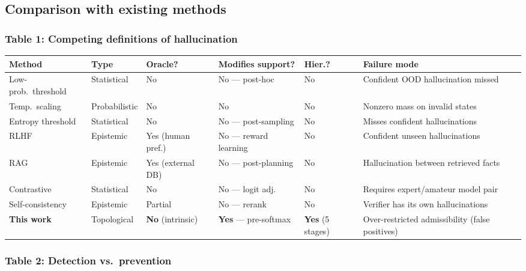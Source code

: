 \documentclass[11pt,a4paper]{article}
\begin{document}
\subsection{Comparison with existing methods}

\subsubsection*{Table 1: Competing definitions of hallucination}

\begin{center}
\renewcommand{\arraystretch}{1.2}\footnotesize
\begin{tabularx}{\linewidth}{p{1.6cm}p{1.65cm}p{1.3cm}p{1.5cm}p{1.4cm}X}
\toprule
\textbf{Method} &
\textbf{Type} &
\textbf{Oracle?} &
\textbf{Modifies support?} &
\textbf{Hier.?} &
\textbf{Failure mode} \\
\midrule
Low-prob.\ threshold & Statistical & No & No — post-hoc & No &
  Confident OOD hallucination missed \\
Temp.\ scaling & Probabilistic & No & No & No &
  Nonzero mass on invalid states \\
Entropy threshold & Statistical & No & No — post-sampling & No &
  Misses confident hallucinations \\
RLHF & Epistemic & Yes (human pref.) & No — reward learning & No &
  Confident unseen hallucinations \\
RAG & Epistemic & Yes (external DB) & No — post-planning & No &
  Hallucination between retrieved facts \\
Contrastive & Statistical & No & No --- logit adj. & No &
  Requires expert/amateur model pair \\
Self-consistency & Epistemic & Partial & No --- rerank & No &
  Verifier has its own hallucinations \\
\midrule
\textbf{This work} & Topological & \textbf{No} (intrinsic) &
  \textbf{Yes} --- pre-softmax &
  \textbf{Yes} (5 stages) &
  Over-restricted admissibility (false positives) \\
\bottomrule
\end{tabularx}
\end{center}

\subsubsection*{Table 2: Detection vs.\ prevention}
\end{document}
